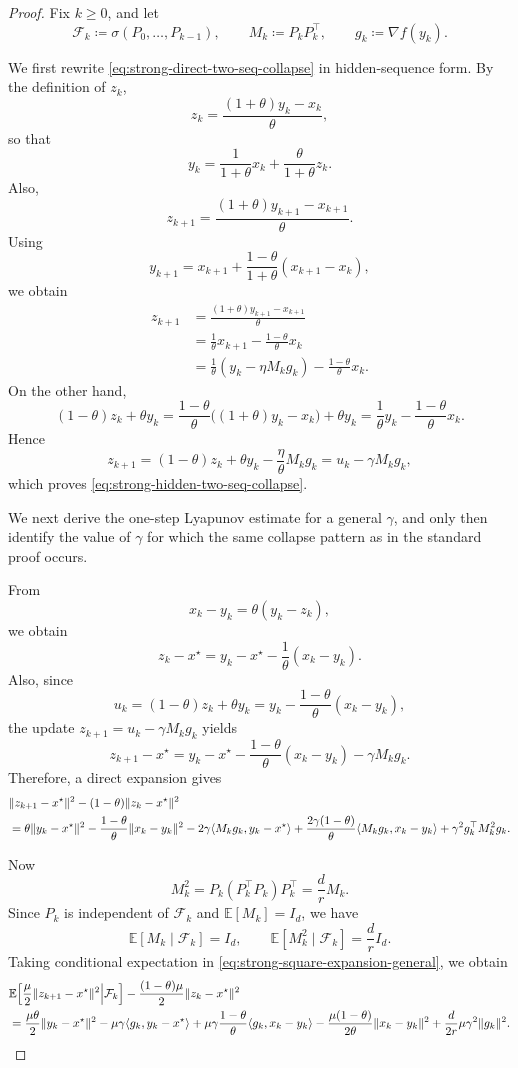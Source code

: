 \documentclass[10pt,a4paper]{amsart}
\begin{document}
\begin{proof}
Fix \(k\ge0\), and let
\[
\mathcal F_k\coloneqq \sigma(P_0,\dots,P_{k-1}),
\qquad
M_k\coloneqq P_kP_k^\top,
\qquad
g_k\coloneqq \nabla f(y_k).
\]

We first rewrite \eqref{eq:strong-direct-two-seq-collapse} in hidden-sequence form.
By the definition of \(z_k\),
\[
z_k=\frac{(1+\theta)y_k-x_k}{\theta},
\]
so that
\[
y_k=\frac{1}{1+\theta}x_k+\frac{\theta}{1+\theta}z_k.
\]
Also,
\[
z_{k+1}
=\frac{(1+\theta)y_{k+1}-x_{k+1}}{\theta}.
\]
Using
\[
y_{k+1}=x_{k+1}+\frac{1-\theta}{1+\theta}(x_{k+1}-x_k),
\]
we obtain
\begin{align*}
z_{k+1}
&=
\frac{(1+\theta)y_{k+1}-x_{k+1}}{\theta}\\
&=
\frac{1}{\theta}x_{k+1}-\frac{1-\theta}{\theta}x_k\\
&=
\frac{1}{\theta}(y_k-\eta M_k g_k)-\frac{1-\theta}{\theta}x_k.
\end{align*}
On the other hand,
\[
(1-\theta)z_k+\theta y_k
=
\frac{1-\theta}{\theta}\bigl((1+\theta)y_k-x_k\bigr)+\theta y_k
=
\frac{1}{\theta}y_k-\frac{1-\theta}{\theta}x_k.
\]
Hence
\[
z_{k+1}=(1-\theta)z_k+\theta y_k-\frac{\eta}{\theta}M_k g_k
=u_k-\gamma M_k g_k,
\]
which proves \eqref{eq:strong-hidden-two-seq-collapse}.

We next derive the one-step Lyapunov estimate for a general \(\gamma\), and only then identify
the value of \(\gamma\) for which the same collapse pattern as in the standard proof occurs.

From
\[
x_k-y_k=\theta(y_k-z_k),
\]
we obtain
\[
z_k-x^\star
=
y_k-x^\star-\frac{1}{\theta}(x_k-y_k).
\]
Also, since
\[
u_k=(1-\theta)z_k+\theta y_k
=
y_k-\frac{1-\theta}{\theta}(x_k-y_k),
\]
the update \(z_{k+1}=u_k-\gamma M_k g_k\) yields
\[
z_{k+1}-x^\star
=
y_k-x^\star-\frac{1-\theta}{\theta}(x_k-y_k)-\gamma M_k g_k.
\]
Therefore, a direct expansion gives
\begin{align}
&\|z_{k+1}-x^\star\|^2-(1-\theta)\|z_k-x^\star\|^2
\notag\\
&=
\theta\|y_k-x^\star\|^2
-\frac{1-\theta}{\theta}\|x_k-y_k\|^2
-2\gamma\langle M_k g_k,y_k-x^\star\rangle
+\frac{2\gamma(1-\theta)}{\theta}\langle M_k g_k,x_k-y_k\rangle
+\gamma^2 g_k^\top M_k^2 g_k.
\label{eq:strong-square-expansion-general}
\end{align}

Now
\[
M_k^2=P_k(P_k^\top P_k)P_k^\top=\frac{d}{r}M_k.
\]
Since \(P_k\) is independent of \(\mathcal F_k\) and \(\mathbb E[M_k]=I_d\), we have
\[
\mathbb E[M_k\mid\mathcal F_k]=I_d,
\qquad
\mathbb E[M_k^2\mid\mathcal F_k]=\frac{d}{r}I_d.
\]
Taking conditional expectation in \eqref{eq:strong-square-expansion-general}, we obtain
\begin{align}
&\mathbb E\!\left[
\frac{\mu}{2}\|z_{k+1}-x^\star\|^2
\middle|\mathcal F_k
\right]
-\frac{(1-\theta)\mu}{2}\|z_k-x^\star\|^2
\notag\\
&=
\frac{\mu\theta}{2}\|y_k-x^\star\|^2
-\mu\gamma\langle g_k,y_k-x^\star\rangle
+\mu\gamma\frac{1-\theta}{\theta}\langle g_k,x_k-y_k\rangle
-\frac{\mu(1-\theta)}{2\theta}\|x_k-y_k\|^2
+\frac{d}{2r}\mu\gamma^2\|g_k\|^2.
\label{eq:strong-z-diff-general}
\end{align}


\end{proof}
\end{document}
